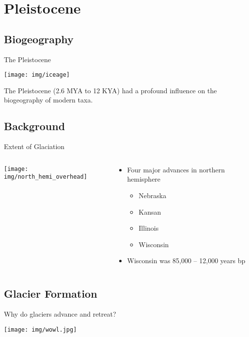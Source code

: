 \documentclass[xcolor=svgnames]{beamer}
\begin{document}
\section{Pleistocene}
\subsection{Biogeography}

\begin{frame}{The Pleistocene}
	\begin{center}
		\begin{block}{}
			\texttt{[image: img/iceage]}
		\end{block}
		\begin{block}{}
			The Pleistocene (2.6 MYA to 12 KYA) had a profound influence on the biogeography of modern taxa.
		\end{block}
	\end{center}
\end{frame}

\subsection{Background}
\begin{frame}{Extent of Glaciation}
	\begin{columns}[T]
		\begin{column}{0.45\textwidth}
			\texttt{[image: img/north\_hemi\_overhead]}
		\end{column}
		\begin{column}{0.45\textwidth}
			\begin{itemize}
				\item Four major advances in northern hemisphere
					\begin{itemize}
						\item Nebraska
						\item Kansan
						\item Illinois
						\item Wisconsin
					\end{itemize}
				\item Wisconsin was 85,000 -- 12,000 years bp
			\end{itemize}
		\end{column}
	\end{columns}
\end{frame}


\subsection{Glacier Formation}
\begin{frame}{Why do glaciers advance and retreat?}
	\begin{center}
		\texttt{[image: img/wowl.jpg]}
	\end{center}
\end{frame}
\end{document}
